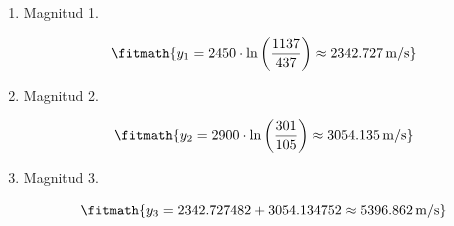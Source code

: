 \begin{enumerate}

\item Magnitud 1.

\[\fitmath{y_{1}=2450\cdot \ln\left(\frac{1137}{437}\right)\approx 2342.727\,\mathrm{m/s}}\]

\item Magnitud 2.

\[\fitmath{y_{2}=2900\cdot \ln\left(\frac{301}{105}\right)\approx 3054.135\,\mathrm{m/s}}\]

\item Magnitud 3.

\[\fitmath{y_{3}=2342.727482+3054.134752\approx 5396.862\,\mathrm{m/s}}\]

\end{enumerate}
